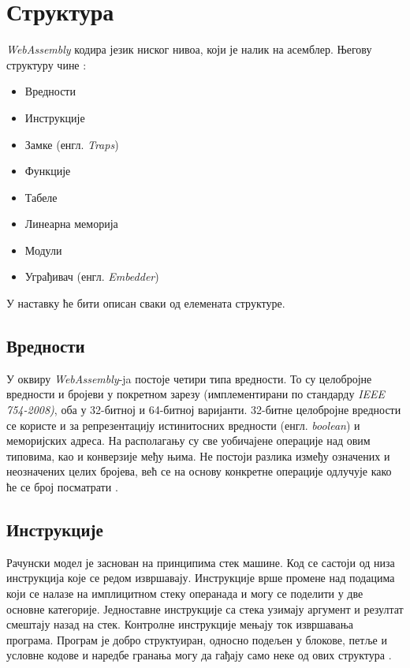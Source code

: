 \documentclass[12pt,oneside]{memoir}
\begin{document}
\section{Структура} \label{chp:STRUCT}

\textit{WebAssembly} кодира језик ниског нивоа, који је налик на асемблер. Његову структуру чине \cite{WASMS}:

\begin{itemize}
	\item Вредности
	\item Инструкције
	\item Замке (енгл. \textit{Traps})
	\item Функције
	\item Табеле
	\item Линеарна меморија
	\item Модули
	\item Уграђивач (енгл. \textit{Embedder})
\end{itemize}
У наставку ће бити описан сваки од елемената структуре.

\subsection{Вредности}

У оквиру \textit{WebAssembly}-ja постоје четири типа вредности. То су целобројне вредности и бројеви у покретном
зарезу (имплементирани по стандарду \textit{IEEE 754-2008)}, оба у 32-битној и 64-битној варијанти. 32-битне
целобројне вредности се користе и за репрезентацију истинитосних вредности (енгл. \textit{boolean}) и меморијских
адреса. На располагању су све уобичајене операције над овим типовима, као и конверзије међу њима. Не постоји разлика
између означених и неозначених целих бројева, већ се на основу конкретне операције одлучује како ће се број
посматрати \cite{WASMS}.

\subsection{Инструкције}

Рачунски модел је заснован на принципима стек машине. Код се састоји од низа инструкција које се редом извршавају.
Инструкције врше промене над подацима који се налазе на имплицитном стеку операнада и могу се поделити у две основне
категорије. Једноставне инструкције са стека узимају аргумент и резултат смештају назад на стек. Контролне
инструкције мењају ток извршавања програма. Програм је добро структуиран, односно подељен у блокове, петље и условне
кодове и наредбе гранања могу да гађају само неке од ових структура \cite{WASMS}.
\end{document}
